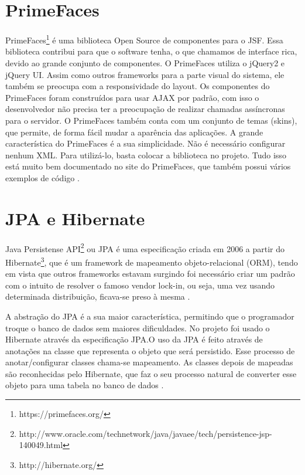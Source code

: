 \section{PrimeFaces}
\label{sec:embasamentoTeoricoPrimeFaces}

PrimeFaces\footnote{https://primefaces.org/} é uma biblioteca Open Source de componentes para o JSF. Essa biblioteca contribui para que o software tenha, o que chamamos de interface rica, devido ao grande conjunto de componentes. O PrimeFaces utiliza o jQuery2 e jQuery UI. Assim como outros frameworks para a parte visual do sistema, ele também se preocupa com a responsividade do layout.
Os componentes do PrimeFaces foram construídos para usar AJAX por padrão, com isso o desenvolvedor não precisa ter a preocupação de realizar chamadas assíncronas para o servidor. O PrimeFaces também conta com um conjunto de temas (skins), que permite, de forma fácil mudar a aparência das aplicações.
A grande característica do PrimeFaces é a sua simplicidade. Não é necessário configurar nenhum XML. Para utilizá-lo, basta colocar a biblioteca no projeto. Tudo isso está muito bem documentado no site do PrimeFaces, que também possui vários exemplos de código \cite{Civici2015}.

\section{JPA e Hibernate}
\label{sec:embasamentoTeoricoJPA}

Java Persistense API\footnote{ http://www.oracle.com/technetwork/java/javaee/tech/persistence-jsp-140049.html} ou JPA é uma especificação criada em 2006 a partir do Hibernate\footnote{http://hibernate.org/}, que é um framework de mapeamento objeto-relacional (ORM), tendo em vista que outros frameworks estavam surgindo foi necessário criar um padrão com o intuito de resolver o famoso vendor lock-in, ou seja, uma vez usando determinada distribuição, ficava-se preso à mesma \cite[p.~12]{Cordeiro2014}.

A abstração do JPA é a sua maior característica, permitindo que o programador troque o banco de dados sem maiores dificuldades. No projeto \imprimirtitulo \space foi usado o Hibernate através da especificação JPA.O uso da JPA é feito através de anotações na classe que representa o objeto que será persistido. Esse processo de anotar/configurar classes chama-se mapeamento. As classes depois de mapeadas são reconhecidas pelo Hibernate, que faz o seu processo natural de converter esse objeto para uma tabela no banco de dados \cite{Cordeiro2014}.


